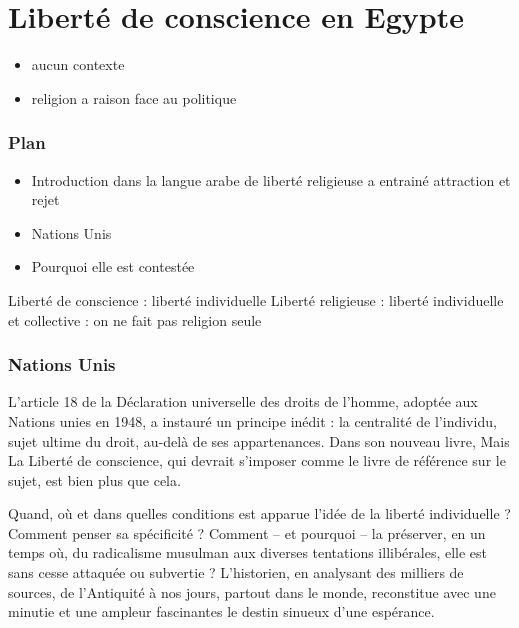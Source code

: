 \chapter{Liberté de conscience en Egypte}

\begin{Def}[Intégralisme]
\begin{itemize}
    \item aucun contexte
    \item religion a raison face au politique
\end{itemize}
\end{Def}


\subsection{Plan}
\begin{itemize}
    \item Introduction dans la langue arabe de liberté religieuse a entrainé attraction et rejet
\item Nations Unis
\item Pourquoi elle est contestée
\end{itemize}

\begin{Prop}
Liberté de conscience : liberté individuelle
Liberté religieuse : liberté individuelle et collective : on ne fait pas religion seule
\end{Prop}


\subsection{Nations Unis}
\begin{quote}
    
\end{quote}
 L’article 18 de la Déclaration universelle des droits de l’homme, adoptée aux Nations unies en 1948, a instauré un principe inédit : la centralité de l’individu, sujet ultime du droit, au-delà de ses appartenances. Dans son nouveau livre,  Mais La Liberté de conscience, qui devrait s’imposer comme le livre de référence sur le sujet, est bien plus que cela.

Quand, où et dans quelles  conditions est apparue l’idée de la liberté individuelle ? Comment penser sa spécificité ? Comment – et pourquoi – la préserver, en un temps où, du radicalisme musulman aux diverses tentations illibérales, elle est sans cesse attaquée ou subvertie ? L’historien, en analysant des milliers de sources, de l’Antiquité à nos jours, partout dans le monde, reconstitue avec une minutie et une ampleur fascinantes le destin sinueux d’une espérance.

